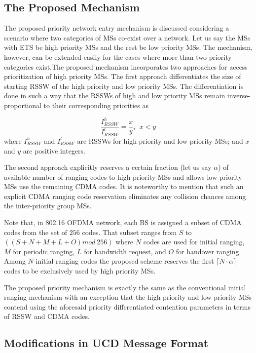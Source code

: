 \documentclass[preprint,12pt]{elsarticle}
\begin{document}
\subsection{The Proposed Mechanism}

The proposed priority network entry mechanism is discussed considering a scenario where two categories of MSs co-exist over a network. Let us say the MSs with ETS be high priority MSs and the rest be low priority MSs. The mechanism, however, can be extended easily for the cases where more than two priority categories exist.The proposed mechanism incorporates two approaches for access prioritization of high priority MSs. The first approach differentiates the size of starting RSSW of the high priority and low priority MSs. The differentiation is done in such a way that the RSSWs of high and low priority MSs remain inverse-proportional to their corresponding priorities as

\begin{equation}
\frac{I^h_{RSSW}}{I^l_{RSSW}}=\frac{x}{y},\ \ x < y
\end{equation}
\noindent where $I^h_{RSSW}$ and $I^l_{RSSW}$ are RSSWs for high priority and low priority MSs; and $x$ and $y$ are positive integers.

The second approach explicitly reserves a certain fraction (let us say $\alpha$) of available number of ranging codes to high priority MSs and allows low priority MSs use the remaining CDMA codes. It is noteworthy to mention that such an explicit CDMA ranging code reservation eliminates any collision chances among the inter-priority group MSs.

Note that, in 802.16 OFDMA network, each BS is assigned a subset of CDMA codes from the set of $256$ codes. That subset ranges from $S$ to $((S+N+M+L+O)mod\ 256)$ where $N$  codes are used for initial ranging, $M$  for periodic ranging,  $L$ for bandwidth request, and $O$  for handover ranging. Among $N$  initial ranging codes the proposed scheme reserves the first $\lceil N \cdot \alpha \rceil$  codes to be exclusively used by high priority MSs.

The proposed priority mechanism is exactly the same as the conventional initial ranging mechanism with an exception that the high priority and low priority MSs contend using the aforesaid priority differentiated contention parameters in terms of RSSW and CDMA codes.

\subsection{Modifications in UCD Message Format}
\end{document}
